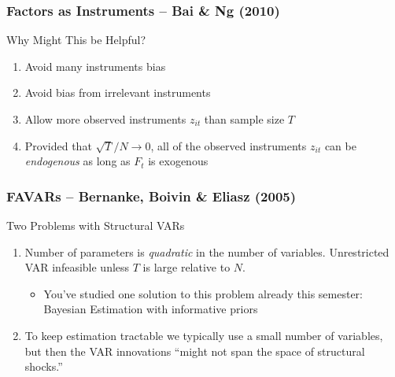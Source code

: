 \documentclass[handout]{beamer}
\begin{document}
\begin{frame}[c]\frametitle{Factors as Instruments -- Bai \& Ng (2010)}
    
\begin{block}
	{Why Might This be Helpful?}
	\begin{enumerate}
		\item Avoid many instruments bias
		\item Avoid bias from irrelevant instruments
		\item Allow more observed instruments $z_{it}$ than sample size $T$
		\item Provided that $\sqrt{T}/N \rightarrow 0$, all of the observed instruments $z_{it}$ can be \emph{endogenous} as long as $F_t$ is exogenous
	\end{enumerate}
\end{block}

\end{frame}
\begin{frame}[c]\frametitle{FAVARs -- Bernanke, Boivin \& Eliasz (2005)}
   
   \begin{block}
    	{Two Problems with Structural VARs}
    	\begin{enumerate}
    		\item Number of parameters is \emph{quadratic} in the number of variables. Unrestricted VAR infeasible unless $T$ is large relative to $N$.\begin{itemize}
    			\item You've studied one solution to this problem already this semester: Bayesian Estimation with informative priors 
    		\end{itemize}
    		\item To keep estimation tractable we typically use a small number of variables, but then the VAR innovations ``might not span the space of structural shocks.''
    	\end{enumerate}
    \end{block} 


\end{frame}
\end{document}
